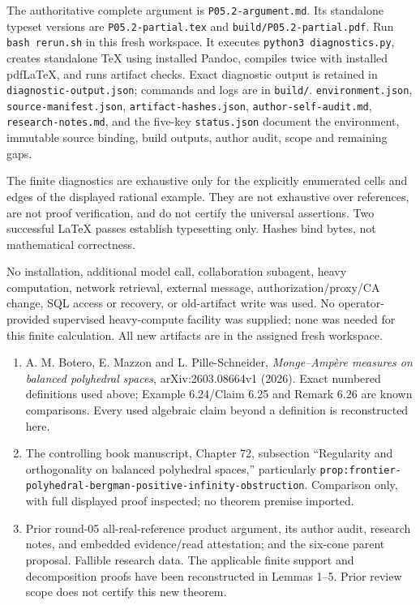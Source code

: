 \documentclass[
  10pt,
]{article}
\providecommand{\tightlist}{%
  \setlength{\itemsep}{0pt}\setlength{\parskip}{0pt}}
\begin{document}
The authoritative complete argument is \texttt{P05.2-argument.md}. Its
standalone typeset versions are \texttt{P05.2-partial.tex} and
\texttt{build/P05.2-partial.pdf}. Run \texttt{bash\ rerun.sh} in this
fresh workspace. It executes \texttt{python3\ diagnostics.py}, creates
standalone TeX using installed Pandoc, compiles twice with installed
pdfLaTeX, and runs artifact checks. Exact diagnostic output is retained
in \texttt{diagnostic-output.json}; commands and logs are in
\texttt{build/}. \texttt{environment.json},
\texttt{source-manifest.json}, \texttt{artifact-hashes.json},
\texttt{author-self-audit.md}, \texttt{research-notes.md}, and the
five-key \texttt{status.json} document the environment, immutable source
binding, build outputs, author audit, scope and remaining gaps.

The finite diagnostics are exhaustive only for the explicitly enumerated
cells and edges of the displayed rational example. They are not
exhaustive over references, are not proof verification, and do not
certify the universal assertions. Two successful LaTeX passes establish
typesetting only. Hashes bind bytes, not mathematical correctness.

No installation, additional model call, collaboration subagent, heavy
computation, network retrieval, external message, authorization/proxy/CA
change, SQL access or recovery, or old-artifact write was used. No
operator-provided supervised heavy-compute facility was supplied; none
was needed for this finite calculation. All new artifacts are in the
assigned fresh workspace.

\begin{enumerate}
\def\labelenumi{\arabic{enumi}.}
\tightlist
\item
  A. M. Botero, E. Mazzon and L. Pille-Schneider, \emph{Monge--Ampère
  measures on balanced polyhedral spaces}, arXiv:2603.08664v1 (2026).
  Exact numbered definitions used above; Example 6.24/Claim 6.25 and
  Remark 6.26 are known comparisons. Every used algebraic claim beyond a
  definition is reconstructed here.
\item
  The controlling book manuscript, Chapter 72, subsection ``Regularity
  and orthogonality on balanced polyhedral spaces,'' particularly
  \texttt{prop:frontier-}\allowbreak{}\texttt{polyhedral-}\allowbreak{}\texttt{bergman-}\allowbreak{}\texttt{positive-}\allowbreak{}\texttt{infinity-}\allowbreak{}\texttt{obstruction}.
  Comparison only, with full displayed proof inspected; no theorem
  premise imported.
\item
  Prior round-05 all-real-reference product argument, its author audit,
  research notes, and embedded evidence/read attestation; and the
  six-cone parent proposal. Fallible research data. The applicable
  finite support and decomposition proofs have been reconstructed in
  Lemmas 1--5. Prior review scope does not certify this new theorem.
\end{enumerate}
\end{document}
